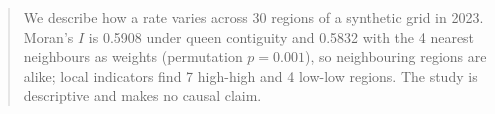 \begin{abstract}
We describe how a rate varies across 30 regions of a synthetic grid in 2023. Moran's $I$ is 0.5908 under queen contiguity and 0.5832 with the 4 nearest neighbours as weights (permutation $p = 0.001$), so neighbouring regions are alike; local indicators find 7 high-high and 4 low-low regions. The study is descriptive and makes no causal claim.
\end{abstract}
